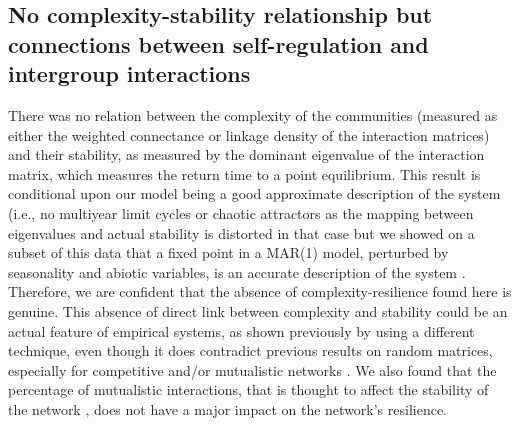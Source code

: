 \documentclass[10pt]{article}
\begin{document}
\subsection*{No complexity-stability relationship but connections between self-regulation
and intergroup interactions}

There was no relation between the complexity of the communities (measured
as either the weighted connectance or linkage density of the interaction
matrices) and their stability, as measured by the dominant eigenvalue
of the interaction matrix, which measures the return time to a point
equilibrium. This result is conditional upon our model being a good
approximate description of the system (i.e., no multiyear limit cycles
or chaotic attractors as the mapping between eigenvalues and actual
stability is distorted in that case \citep{certain_how_2018}
but we showed on a subset of this data that a fixed point in a MAR(1)
model, perturbed by seasonality and abiotic variables, is an accurate
description of the system \citep{barraquand_coastal_2018}. Therefore,
we are confident that the absence of complexity-resilience found here
is genuine. This absence of direct link between complexity and stability
could be an actual feature of empirical systems, as shown previously
by \citet{jacquet_no_2016} using a different technique,
even though it does contradict previous results on random matrices,
especially for competitive and/or mutualistic networks \citep{allesina_stability_2012}.
We also found that the percentage of mutualistic interactions, that
is thought to affect the stability of the network \citep{mougi2012diversity,coyte_ecology_2015,garcia-callejas_multiple_2018},
does not have a major impact on the network's resilience.
\end{document}
